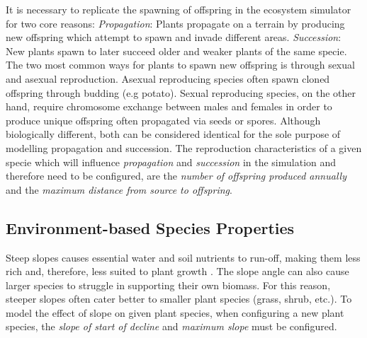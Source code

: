 It is necessary to replicate the spawning of offspring in the ecosystem simulator for two core reasons: \textit{Propagation}: Plants propagate on a terrain by producing new offspring which attempt to spawn and invade different areas. \textit{Succession}: New plants spawn to later succeed older and weaker plants of the same specie.\\ 
The two most common ways for plants to spawn new offspring is through sexual and asexual reproduction. Asexual reproducing species often spawn cloned offspring through budding (e.g potato). Sexual reproducing species, on the other hand, require chromosome exchange between males and females in order to produce unique offspring often propagated via seeds or spores. Although biologically different, both can be considered identical for the sole purpose of modelling propagation and succession. The reproduction characteristics of a given specie which will influence \textit{propagation} and \textit{succession} in the simulation and therefore need to be configured, are the \textit{number of offspring produced annually} and the \textit{maximum distance from source to offspring}.\\

\subsection{Environment-based Species Properties}

Steep slopes causes essential water and soil nutrients to run-off, making them less rich and, therefore, less suited to plant growth \cite{Kapolka2001}. The slope angle can also cause larger species to struggle in supporting their own biomass. For this reason, steeper slopes often cater better to smaller plant species (grass, shrub, etc.). To model the effect of slope on given plant species, when configuring a new plant species, the \textit{slope of start of decline} and \textit{maximum slope} must be configured.\\

